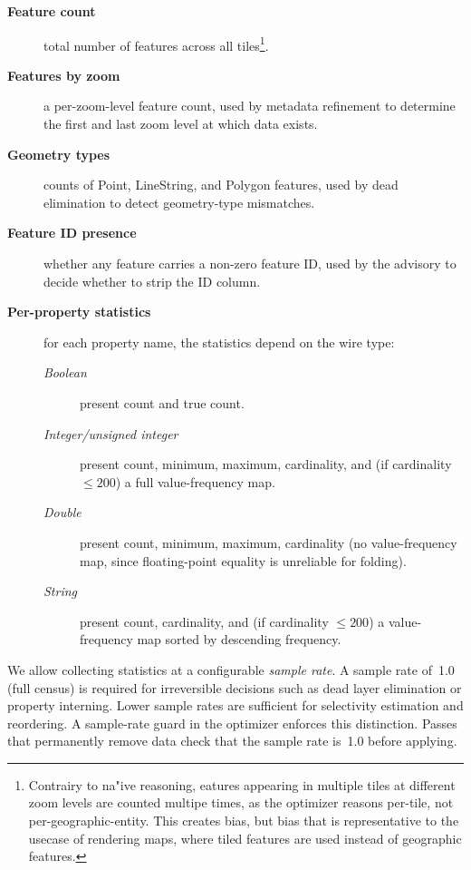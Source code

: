 {\begin{description}
    \item[\textbf{Feature count}] total number of features across all tiles\footnote{Contrairy to na"ive reasoning, eatures appearing in multiple tiles at different zoom levels are counted multipe times, as the optimizer reasons per-tile, not per-geographic-entity.
This creates bias, but bias that is representative to the usecase of rendering maps, where tiled features are used instead of geographic features.}.
    \item[\textbf{Features by zoom}] a per-zoom-level feature count, used by metadata refinement to determine the first and last zoom level at which data exists.
    \item[\textbf{Geometry types}] counts of Point, LineString, and Polygon features, used by dead elimination to detect geometry-type mismatches.
    \item[\textbf{Feature ID presence}] whether any feature carries a non-zero feature ID, used by the advisory to decide whether to strip the ID column.
    \item[\textbf{Per-property statistics}] for each property name, the statistics depend on the wire type:
    \begin{description}
        \item[\emph{Boolean}] present count and true count.
        \item[\emph{Integer/unsigned integer}] present count, minimum, maximum, cardinality, and (if cardinality $\leq 200$) a full value-frequency map.
        \item[\emph{Double}] present count, minimum, maximum, cardinality (no value-frequency map, since floating-point equality is unreliable for folding).
        \item[\emph{String}] present count, cardinality, and (if cardinality $\leq 200$) a value-frequency map sorted by descending frequency.
    \end{description}
\end{description}

We allow collecting statistics at a configurable \emph{sample rate}.
A sample rate of~1.0 (full census) is required for irreversible decisions such as dead layer elimination or property interning.
Lower sample rates are sufficient for selectivity estimation and reordering.
A sample-rate guard in the optimizer enforces this distinction.
Passes that permanently remove data check that the sample rate is~1.0 before applying.

}
